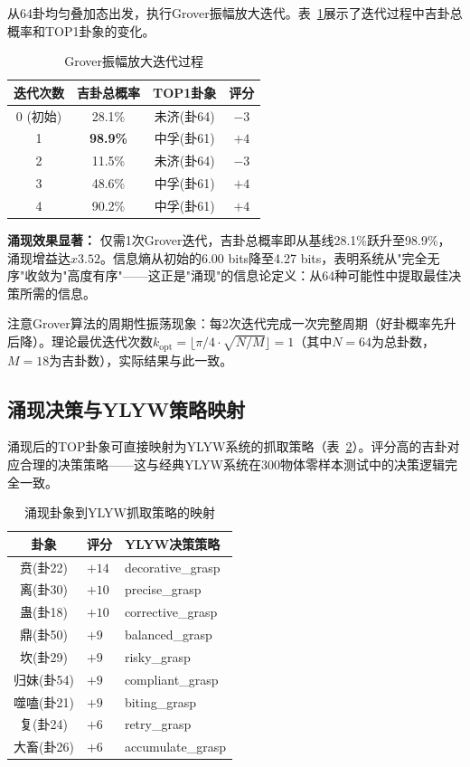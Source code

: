 \documentclass[twocolumn]{article}
\begin{document}
从64卦均匀叠加态出发，执行Grover振幅放大迭代。表~\ref{tab:grover}展示了迭代过程中吉卦总概率和TOP1卦象的变化。

\begin{table}[htbp]
\centering
\caption{Grover振幅放大迭代过程}
\label{tab:grover}
\begin{tabular}{cccc}
\toprule
\textbf{迭代次数} & \textbf{吉卦总概率} & \textbf{TOP1卦象} & \textbf{评分} \\
\midrule
0 (初始) & 28.1\% & 未济(卦64) & $-3$ \\
1 & \textbf{98.9\%} & 中孚(卦61) & $+4$ \\
2 & 11.5\% & 未济(卦64) & $-3$ \\
3 & 48.6\% & 中孚(卦61) & $+4$ \\
4 & 90.2\% & 中孚(卦61) & $+4$ \\
\bottomrule
\end{tabular}
\end{table}

\textbf{涌现效果显著：} 仅需1次Grover迭代，吉卦总概率即从基线28.1\%跃升至98.9\%，涌现增益达$x3.52$。信息熵从初始的6.00 bits降至4.27 bits，表明系统从"完全无序"收敛为"高度有序"——这正是"涌现"的信息论定义：从64种可能性中提取最佳决策所需的信息。

注意Grover算法的周期性振荡现象：每2次迭代完成一次完整周期（好卦概率先升后降）。理论最优迭代次数$k_{\text{opt}} = \lfloor \pi/4 \cdot \sqrt{N/M} \rfloor = 1$（其中$N=64$为总卦数，$M=18$为吉卦数），实际结果与此一致。

\subsection{涌现决策与YLYW策略映射}

涌现后的TOP卦象可直接映射为YLYW系统的抓取策略（表~\ref{tab:mapping}）。评分高的吉卦对应合理的决策策略——这与经典YLYW系统在300物体零样本测试中的决策逻辑完全一致。

\begin{table}[htbp]
\centering
\caption{涌现卦象到YLYW抓取策略的映射}
\label{tab:mapping}
\begin{tabular}{cll}
\toprule
\textbf{卦象} & \textbf{评分} & \textbf{YLYW决策策略} \\
\midrule
贲(卦22) & $+14$ & decorative\_grasp \\
离(卦30) & $+10$ & precise\_grasp \\
蛊(卦18) & $+10$ & corrective\_grasp \\
鼎(卦50) & $+9$ & balanced\_grasp \\
坎(卦29) & $+9$ & risky\_grasp \\
归妹(卦54) & $+9$ & compliant\_grasp \\
噬嗑(卦21) & $+9$ & biting\_grasp \\
复(卦24) & $+6$ & retry\_grasp \\
大畜(卦26) & $+6$ & accumulate\_grasp \\
\bottomrule
\end{tabular}
\end{table}
\end{document}
